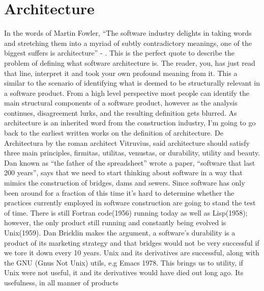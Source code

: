 \section{Architecture}
	
	In the words of Martin Fowler, ``The software industry delights in taking words and stretching them into a myriad of subtly contradictory meanings,
	one of the biggest suffers is architecture'' - \citet{FowlerPatternsArchiteture}.  
	This is the perfect quote to describe the problem of defining what software architecture is.  
	The reader, you, has just read that line, interpret it and took your own profound meaning from it.  
	This a similar to the scenario of identifying what is deemed to be structurally relevant in a software product.  
	From a high level perspective most people can identify the main structural components of a software product, 
	however as the analysis continues, disagreement lurks, and the resulting definition gets blurred.
	\newline
	\newline
	As architecture is an inherited word from the construction industry, I'm going to go back to the earliest written works on the definition of
	architecture.  De Architectura by the roman architect Vitruvius, said architecture should satisfy three main principles, firmitas, utilitas, venustas,
	or durability, utility and beauty.
	\newline
	\newline
	Dan  known as ``the father of the spreadsheet'' wrote a paper, ``software that last 200 years'', says that we need to start thinking
	about software in a way that mimics the construction of bridges, dams and sewers.  Since software has only been around for a fraction of this time
	it's hard to determine whether the practices currently employed in software construction are going to stand the test of time.  
	There is still Fortran code(1956) running today as well as Lisp(1958); however, the only product still running and constantly being evolved is Unix(1959).
	Dan Bricklin makes the argument, a software's durability is a product of its marketing strategy and that bridges would not be very successful 
	if we tore it down every 10 years.  Unix and its derivatives are successful, along with the GNU (Gnus Not Unix) utils, e.g Emacs 1978. 
	\newline
	\newline
	This brings us to utility, if Unix were not useful, it and its derivatives would have died out long ago.  Its usefulness, in all manner of products
